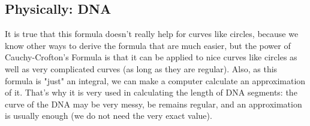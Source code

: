 \documentclass[a4paper]{article}
\begin{document}
\subsection{Physically: DNA}
It is true that this formula doesn't really help for curves like circles, because we know other ways to derive the formula that are much easier, but the power of Cauchy-Crofton's Formula is that it can be applied to nice curves like circles as well as very complicated curves (as long as they are regular). Also, as this formula is "just" an integral, we can make a computer calculate an approximation of it. That's why it is very used in calculating the length of DNA segments: the curve of the DNA may be very messy, be remains regular, and an approximation is usually enough (we do not need the very exact value).
\end{document}
